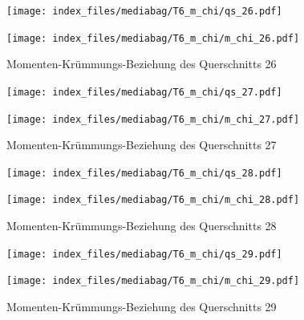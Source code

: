 \documentclass[
  11pt,
  letterpaper,
]{scrreprt}
\begin{document}
\begin{figure}[H]

\begin{minipage}{0.50\linewidth}
\texttt{[image: index\_files/mediabag/T6\_m\_chi/qs\_26.pdf]}\end{minipage}%
%
\begin{minipage}{0.50\linewidth}
\texttt{[image: index\_files/mediabag/T6\_m\_chi/m\_chi\_26.pdf]}\end{minipage}%

\caption{\label{fig-mchi_anhang}Momenten-Krümmungs-Beziehung des
Querschnitts 26}

\end{figure}%

\begin{figure}[H]

\begin{minipage}{0.50\linewidth}
\texttt{[image: index\_files/mediabag/T6\_m\_chi/qs\_27.pdf]}\end{minipage}%
%
\begin{minipage}{0.50\linewidth}
\texttt{[image: index\_files/mediabag/T6\_m\_chi/m\_chi\_27.pdf]}\end{minipage}%

\caption{\label{fig-mchi_anhang}Momenten-Krümmungs-Beziehung des
Querschnitts 27}

\end{figure}%

\begin{figure}[H]

\begin{minipage}{0.50\linewidth}
\texttt{[image: index\_files/mediabag/T6\_m\_chi/qs\_28.pdf]}\end{minipage}%
%
\begin{minipage}{0.50\linewidth}
\texttt{[image: index\_files/mediabag/T6\_m\_chi/m\_chi\_28.pdf]}\end{minipage}%

\caption{\label{fig-mchi_anhang}Momenten-Krümmungs-Beziehung des
Querschnitts 28}

\end{figure}%

\begin{figure}[H]

\begin{minipage}{0.50\linewidth}
\texttt{[image: index\_files/mediabag/T6\_m\_chi/qs\_29.pdf]}\end{minipage}%
%
\begin{minipage}{0.50\linewidth}
\texttt{[image: index\_files/mediabag/T6\_m\_chi/m\_chi\_29.pdf]}\end{minipage}%

\caption{\label{fig-mchi_anhang}Momenten-Krümmungs-Beziehung des
Querschnitts 29}

\end{figure}%
\end{document}
